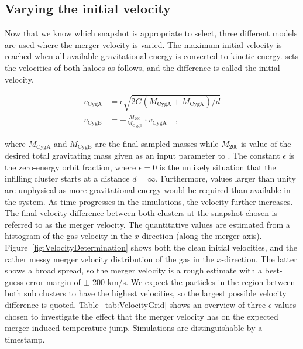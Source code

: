 \documentclass[MScProj_TLRH_ClusterEnergy.tex]{subfiles}
\begin{document}
\newpage
\subsection{Varying the initial velocity}
\label{sec:InitialVelocity}
Now that we know which snapshot is appropriate to select, three different models
are used where the merger velocity is varied. The maximum initial velocity is 
reached when all available gravitational energy is converted to kinetic
energy.  sets the velocities of both haloes as follows, and the 
difference is called the initial velocity.

\begin{align}
    v_{\text{CygA}} &= \epsilon  \sqrt{2G ( M_{\text{CygA}} +  M_{\text{CygA}})/d}
     \label{eq:zeroeorbitfrac} \\
    v_{\text{CygB}} &= - \frac{ M_{200}}{M_{\text{CygB}}} \cdot v_{\text{CygA}} 
     \quad ,
\end{align}

\noindent where $M_{\text{CygA}}$ and $M_{\text{CygB}}$ are the final sampled 
masses while $M_{200}$ is value of the desired total gravitating mass given as an
input parameter to . The constant $\epsilon$ is the zero-energy orbit
fraction, where $\epsilon = 0$ is the unlikely situation that the infilling cluster
starts at a distance $d = \infty$. Furthermore, values larger than unity are
unphysical as more gravitational energy would be required than available in the 
system. As time progresses in the simulations, the velocity further increases.
The final velocity difference between both clusters at the snapshot chosen is 
referred to as the merger velocity. The quantitative values are estimated from a
histogram of the gas velocity in the $x$-direction (along the merger-axis).
Figure~\ref{fig:VelocityDetermination} shows both the clean initial velocities,
and the rather messy merger velocity distribution of the gas in the $x$-direction.
The latter shows a broad spread, so the merger velocity is a rough estimate with 
a best-guess error margin of $\pm$ 200 km/s. We expect the particles in the region
between both sub clusters to have the highest velocities, so the largest possible 
velocity difference is quoted. Table~\ref{tab:VelocityGrid} shows an overview of
three $\epsilon$-values chosen to investigate the effect that the merger velocity
has on the expected merger-induced temperature jump. Simulations are distinguishable
by a timestamp. 
\end{document}

